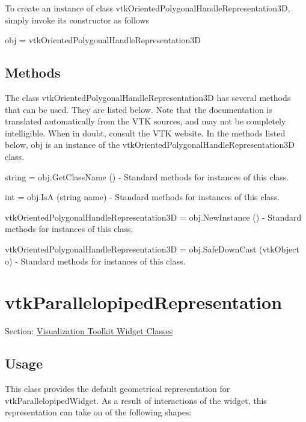 To create an instance of class vtk\-Oriented\-Polygonal\-Handle\-Representation3\-D, simply invoke its constructor as follows \begin{DoxyVerb}  obj = vtkOrientedPolygonalHandleRepresentation3D
\end{DoxyVerb}
 \hypertarget{vtkwidgets_vtkxyplotwidget_Methods}{}\subsection{Methods}\label{vtkwidgets_vtkxyplotwidget_Methods}
The class vtk\-Oriented\-Polygonal\-Handle\-Representation3\-D has several methods that can be used. They are listed below. Note that the documentation is translated automatically from the V\-T\-K sources, and may not be completely intelligible. When in doubt, consult the V\-T\-K website. In the methods listed below, {\ttfamily obj} is an instance of the vtk\-Oriented\-Polygonal\-Handle\-Representation3\-D class. 
\begin{DoxyItemize}
\item {\ttfamily string = obj.\-Get\-Class\-Name ()} -\/ Standard methods for instances of this class.  
\item {\ttfamily int = obj.\-Is\-A (string name)} -\/ Standard methods for instances of this class.  
\item {\ttfamily vtk\-Oriented\-Polygonal\-Handle\-Representation3\-D = obj.\-New\-Instance ()} -\/ Standard methods for instances of this class.  
\item {\ttfamily vtk\-Oriented\-Polygonal\-Handle\-Representation3\-D = obj.\-Safe\-Down\-Cast (vtk\-Object o)} -\/ Standard methods for instances of this class.  
\end{DoxyItemize}\hypertarget{vtkwidgets_vtkparallelopipedrepresentation}{}\section{vtk\-Parallelopiped\-Representation}\label{vtkwidgets_vtkparallelopipedrepresentation}
Section\-: \hyperlink{sec_vtkwidgets}{Visualization Toolkit Widget Classes} \hypertarget{vtkwidgets_vtkxyplotwidget_Usage}{}\subsection{Usage}\label{vtkwidgets_vtkxyplotwidget_Usage}
This class provides the default geometrical representation for vtk\-Parallelopiped\-Widget. As a result of interactions of the widget, this representation can take on of the following shapes\-: 

